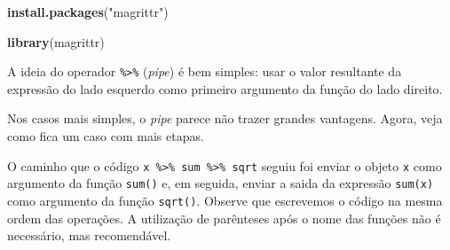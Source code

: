 \documentclass[]{book}
\newenvironment{Shaded}{\begin{snugshade}}{\end{snugshade}}
\newcommand{\CommentTok}[1]{\textcolor[rgb]{0.56,0.35,0.01}{\textit{#1}}}
\newcommand{\DecValTok}[1]{\textcolor[rgb]{0.00,0.00,0.81}{#1}}
\newcommand{\KeywordTok}[1]{\textcolor[rgb]{0.13,0.29,0.53}{\textbf{#1}}}
\newcommand{\NormalTok}[1]{#1}
\newcommand{\OperatorTok}[1]{\textcolor[rgb]{0.81,0.36,0.00}{\textbf{#1}}}
\newcommand{\StringTok}[1]{\textcolor[rgb]{0.31,0.60,0.02}{#1}}
\begin{document}
\begin{Shaded}
\begin{Highlighting}[]
\KeywordTok{install.packages}\NormalTok{(}\StringTok{"magrittr"}\NormalTok{)}

\KeywordTok{library}\NormalTok{(magrittr)}
\end{Highlighting}
\end{Shaded}

A ideia do operador \texttt{\%\textgreater{}\%} (\emph{pipe}) é bem simples: usar o valor resultante da expressão do lado esquerdo como primeiro argumento da função do lado direito.

\begin{Shaded}
\end{Shaded}

Nos casos mais simples, o \emph{pipe} parece não trazer grandes vantagens. Agora, veja como fica um caso com mais etapas.

\begin{Shaded}
\end{Shaded}

O caminho que o código \texttt{x\ \%\textgreater{}\%\ sum\ \%\textgreater{}\%\ sqrt} seguiu foi enviar o objeto \texttt{x} como argumento da função \texttt{sum()} e, em seguida, enviar a saida da expressão \texttt{sum(x)} como argumento da função \texttt{sqrt()}. Observe que escrevemos o código na mesma ordem das operações. A utilização de parênteses após o nome das funções não é necessário, mas recomendável.
\end{document}
